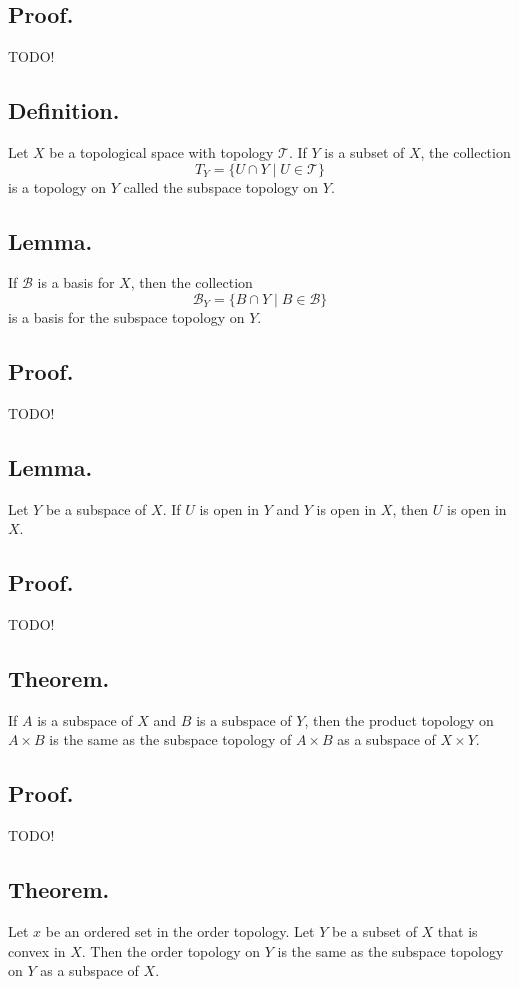 \documentclass[titlepage]{article}
\begin{document}
\subsection{Proof.} TODO!

\subsection{Definition.} Let $X$ be a topological space with topology $\mathcal{T}$. If $Y$ is a subset of $X$, the collection 
$$T_{Y} = \{U \cap Y \mid U \in \mathcal{T}\}$$
is a topology on $Y$ called the subspace topology on $Y$.

\subsection{Lemma.} If $\mathcal{B}$ is a basis for $X$, then the collection 
$$\mathcal{B}_{Y} = \{B \cap Y \mid B \in \mathcal{B}\}$$
is a basis for the subspace topology on $Y$.

\subsection{Proof.} TODO!

\subsection{Lemma.} Let $Y$ be a subspace of $X$. If $U$ is open in $Y$ and $Y$ is open in $X$, then $U$ is open in $X$.

\subsection{Proof.} TODO!

\subsection{Theorem.} If $A$ is a subspace of $X$ and $B$ is a subspace of $Y$, then the product topology on $A \times B$ is the same as the subspace topology of $A \times B$ as a subspace of $X \times Y$.

\subsection{Proof.} TODO!

\subsection{Theorem.} Let $x$ be an ordered set in the order topology. Let $Y$ be a subset of $X$ that is convex in $X$. Then the order topology on $Y$ is the same as the subspace topology on $Y$ as a subspace of $X$.
\end{document}
